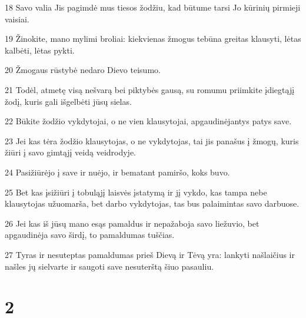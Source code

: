 \par 18 Savo valia Jis pagimdė mus tiesos žodžiu, kad būtume tarsi Jo kūrinių pirmieji vaisiai. 
\par 19 Žinokite, mano mylimi broliai: kiekvienas žmogus tebūna greitas klausyti, lėtas kalbėti, lėtas pykti. 
\par 20 Žmogaus rūstybė nedaro Dievo teisumo. 
\par 21 Todėl, atmetę visą nešvarą bei piktybės gausą, su romumu priimkite įdiegtąjį žodį, kuris gali išgelbėti jūsų sielas. 
\par 22 Būkite žodžio vykdytojai, o ne vien klausytojai, apgaudinėjantys patys save. 
\par 23 Jei kas tėra žodžio klausytojas, o ne vykdytojas, tai jis panašus į žmogų, kuris žiūri į savo gimtąjį veidą veidrodyje. 
\par 24 Pasižiūrėjo į save ir nuėjo, ir bematant pamiršo, koks buvo. 
\par 25 Bet kas įsižiūri į tobuląjį laisvės įstatymą ir jį vykdo, kas tampa nebe klausytojas užuomarša, bet darbo vykdytojas, tas bus palaimintas savo darbuose. 
\par 26 Jei kas iš jūsų mano esąs pamaldus ir nepažaboja savo liežuvio, bet apgaudinėja savo širdį, to pamaldumas tuščias. 
\par 27 Tyras ir nesuteptas pamaldumas prieš Dievą ir Tėvą yra: lankyti našlaičius ir našles jų sielvarte ir saugoti save nesuterštą šiuo pasauliu.


\chapter{2}


